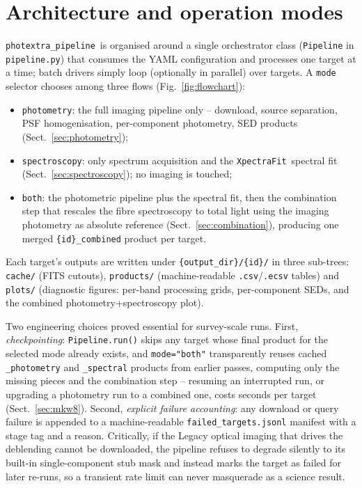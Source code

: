\documentclass{aa}
\newcommand{\photextra}{\texttt{photextra\_pipeline}}
\newcommand{\xpectrafit}{\texttt{XpectraFit}}
\begin{document}
\section{Architecture and operation modes}
\label{sec:architecture}

\photextra\ is organised around a single orchestrator class
(\texttt{Pipeline} in \texttt{pipeline.py}) that consumes the YAML
configuration and processes one target at a time; batch drivers simply
loop (optionally in parallel) over targets. A \texttt{mode} selector
chooses among three flows (Fig.~\ref{fig:flowchart}):

\begin{itemize}
\item \texttt{photometry}: the full imaging pipeline only -- download,
  source separation, PSF homogenisation, per-component photometry, SED
  products (Sect.~\ref{sec:photometry});
\item \texttt{spectroscopy}: only spectrum acquisition and the
  \xpectrafit\ spectral fit (Sect.~\ref{sec:spectroscopy}); no imaging is
  touched;
\item \texttt{both}: the photometric pipeline plus the spectral fit, then
  the combination step that rescales the fibre spectroscopy to total
  light using the imaging photometry as absolute reference
  (Sect.~\ref{sec:combination}), producing one merged
  \texttt{\{id\}\_combined} product per target.
\end{itemize}

Each target's outputs are written under
\texttt{\{output\_dir\}/\{id\}/} in three sub-trees: \texttt{cache/}
(FITS cutouts), \texttt{products/} (machine-readable
\texttt{.csv}/\texttt{.ecsv} tables) and \texttt{plots/} (diagnostic
figures: per-band processing grids, per-component SEDs, and the combined
photometry+spectroscopy plot).

Two engineering choices proved essential for survey-scale runs. First,
\emph{checkpointing}: \texttt{Pipeline.run()} skips any target whose
final product for the selected mode already exists, and
\texttt{mode="both"} transparently reuses cached \texttt{\_photometry}
and \texttt{\_spectral} products from earlier passes, computing only the
missing pieces and the combination step -- resuming an interrupted run,
or upgrading a photometry run to a combined one, costs seconds per target
(Sect.~\ref{sec:mkw8}). Second, \emph{explicit failure accounting}: any
download or query failure is appended to a machine-readable
\texttt{failed\_targets.jsonl} manifest with a stage tag and a reason.
Critically, if the Legacy optical imaging that drives the deblending
cannot be downloaded, the pipeline refuses to degrade silently to its
built-in single-component stub mask and instead marks the target as
failed for later re-runs, so a transient rate limit can never masquerade
as a science result.
\end{document}
